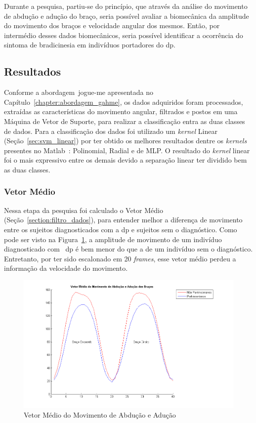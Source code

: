Durante a pesquisa, partiu-se do princípio, que através da análise do movimento de abdução e adução do braço, seria possível avaliar a biomecânica da amplitude do movimento dos braços e velocidade angular dos mesmos. Então, por intermédio desses dados biomecânicos, seria possível identificar a ocorrência do sintoma de bradicinesia em indivíduos portadores do \ac{dp}.



\subsection{Resultados}
Conforme a abordagem~\ac{jogue-me} apresentada no Capítulo~\ref{chapter:abordagem_gahme}, os dados adquiridos foram processados, extraídas as características do movimento angular, filtrados e postos em uma Máquina de Vetor de Suporte, para realizar a classificação entra as duas classes de dados. Para a classificação dos dados foi utilizado um \textit{kernel} Linear (Seção~\ref{sec:svm_linear}) por ter obtido os melhores resultados dentre os \textit{kernels} presentes no Matlab~\cite{matlab2011}: Polinomial, Radial e de MLP. O resultado do \textit{kernel} linear foi o mais expressivo entre os demais devido a separação linear ter dividido bem as duas classes. 

\subsubsection{Vetor Médio}
Nessa etapa da pesquisa foi calculado o Vetor Médio (Seção~\ref{section:filtro_dados}), para entender melhor a diferença de movimento entre os sujeitos diagnosticados com a \ac{dp} e sujeitos sem o diagnóstico. Como pode ser visto na Figura~\ref{fig:vetor_medio_abducao}, a amplitude de movimento de um indivíduo diagnosticado com ~\ac{dp} é bem menor do que a de um indivíduo sem o diagnóstico. Entretanto, por ter sido escalonado em 20 \textit{frames}, esse vetor médio perdeu a informação da velocidade do movimento.

\begin{figure}[!htbp]
 \centering
 \includegraphics[scale=0.650]{./img/vetormedioaducao.png}
 \caption{Vetor Médio do Movimento de Abdução e Adução}
 \label{fig:vetor_medio_abducao}
\end{figure}

